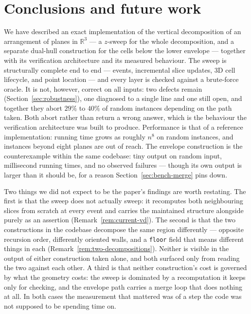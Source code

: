 \documentclass[11pt]{article}
\newcommand{\R}{\mathbb{R}}
\begin{document}
\section{Conclusions and future work}
\label{sec:future}

We have described an exact implementation of the vertical decomposition of an
arrangement of planes in $\R^3$ --- a $z$-sweep for the whole decomposition, and
a separate dual-hull construction for the cells below the lower envelope ---
together with its verification architecture and its measured behaviour.  The
sweep is structurally complete end to end --- events, incremental slice updates,
3D cell lifecycle, and point location --- and every layer is checked against a
brute-force oracle.
It is not, however, correct on all inputs: two defects remain
(Section~\ref{sec:robustness}), one diagnosed to a single line and one still
open, and together they abort $29\%$ to $40\%$ of random instances depending on
the path taken.  Both abort rather than return a wrong answer, which is the
behaviour the verification architecture was built to produce.  Performance is
that of a reference implementation: running time grows as roughly $n^8$ on
random instances, and instances beyond eight planes are out of reach.  The
envelope construction is the counterexample within the same codebase: tiny
output on random input, millisecond running times, and no observed failures ---
though its own output is larger than it should be, for a reason
Section~\ref{sec:bench-merge} pins down.

Two things we did not expect to be the paper's findings are worth restating.
The first is that the sweep does not actually sweep: it recomputes both
neighbouring slices from scratch at every event and carries the maintained
structure alongside purely as an assertion
(Remark~\ref{rem:current-vd}).  The second is that the two constructions in the
codebase decompose the same region differently --- opposite recursion order,
differently oriented walls, and a \verb|floor| field that means different
things in each (Remark~\ref{rem:two-decompositions}).  Neither is visible in
the output of either construction taken alone, and both surfaced only from
reading the two against each other.  A third is that neither construction's
cost is governed by what the geometry costs: the sweep is dominated by a
recomputation it keeps only for checking, and the envelope path carries a merge
loop that does nothing at all.  In both cases the measurement that mattered was
of a step the code was not supposed to be spending time on.
\end{document}
